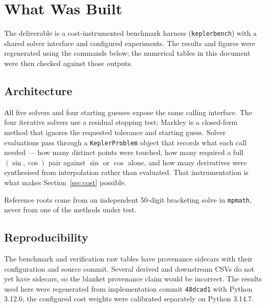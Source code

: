 \documentclass[11pt,a4paper]{article}
\begin{document}
\section{What Was Built}

The deliverable is a cost-instrumented benchmark harness
(\texttt{keplerbench}) with a shared solver interface and configured
experiments. The results and figures were regenerated using the commands
below; the numerical tables in this document were then checked against
those outputs.

\subsection{Architecture}

All five solvers and four starting guesses expose the same calling
interface. The four iterative solvers use a residual stopping test;
Markley is a closed-form method that ignores the requested tolerance and
starting guess. Solver evaluations pass through a
\texttt{KeplerProblem} object that records what each call needed
--- how many distinct points were touched, how many required a full
$(\sin,\cos)$ pair against $\sin$ or $\cos$ alone, and how many
derivatives were synthesised from interpolation rather than evaluated.
That instrumentation is what makes Section~\ref{sec:cost} possible.

Reference roots come from an independent 50-digit bracketing solve in
\texttt{mpmath}, never from one of the methods under test.

\subsection{Reproducibility}

The benchmark and verification raw tables have provenance sidecars with
their configuration and source commit. Several derived and downstream
CSVs do not yet have sidecars, so the blanket provenance claim would be
incorrect. The results used here were regenerated from implementation
commit \texttt{48dcad1} with Python 3.12.6; the configured cost weights
were calibrated separately on Python 3.14.7.
\end{document}
